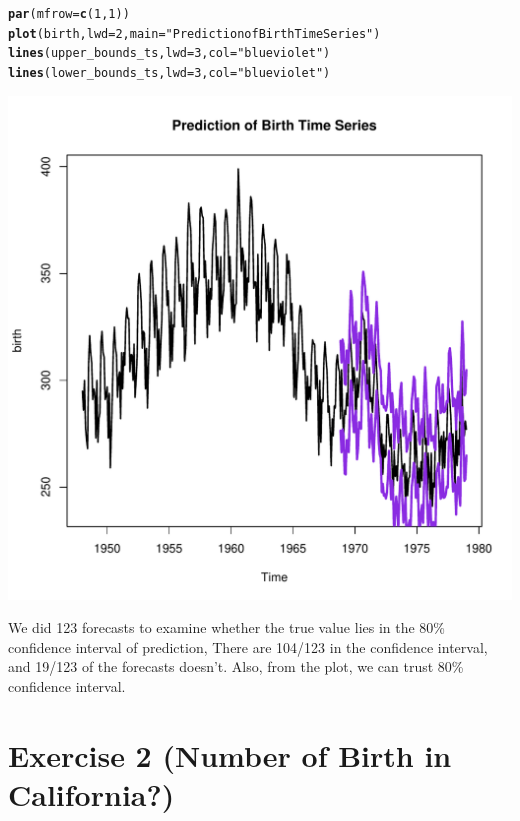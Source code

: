 \documentclass[10pt]{article}\usepackage[]{graphicx}\usepackage[]{color}
\makeatletter
\def\maxwidth{ %
  \ifdim\Gin@nat@width>\linewidth
    \linewidth
  \else
    \Gin@nat@width
  \fi
}
\newcommand{\hlnum}[1]{\textcolor[rgb]{0.686,0.059,0.569}{#1}}%
\newcommand{\hlstr}[1]{\textcolor[rgb]{0.192,0.494,0.8}{#1}}%
\newcommand{\hlstd}[1]{\textcolor[rgb]{0.345,0.345,0.345}{#1}}%
\newcommand{\hlkwc}[1]{\textcolor[rgb]{0.333,0.667,0.333}{#1}}%
\newcommand{\hlkwd}[1]{\textcolor[rgb]{0.737,0.353,0.396}{\textbf{#1}}}%
\newenvironment{kframe}{%
 \def\at@end@of@kframe{}%
 \ifinner\ifhmode%
  \def\at@end@of@kframe{\end{minipage}}%
  \begin{minipage}{\columnwidth}%
 \fi\fi%
 \def\FrameCommand##1{\hskip\@totalleftmargin \hskip-\fboxsep
 \colorbox{shadecolor}{##1}\hskip-\fboxsep
     \hskip-\linewidth \hskip-\@totalleftmargin \hskip\columnwidth}%
 \MakeFramed {\advance\hsize-\width
   \@totalleftmargin\z@ \linewidth\hsize
   \@setminipage}}%
 {\par\unskip\endMakeFramed%
 \at@end@of@kframe}
\newenvironment{knitrout}{}{} %
\makeatother
\begin{document}
\begin{knitrout}
\begin{kframe}
\begin{alltt}
\hlkwd{par}\hlstd{(}\hlkwc{mfrow}\hlstd{=}\hlkwd{c}\hlstd{(}\hlnum{1}\hlstd{,}\hlnum{1}\hlstd{))}
\hlkwd{plot}\hlstd{(birth,} \hlkwc{lwd} \hlstd{=}\hlnum{2}\hlstd{,} \hlkwc{main}\hlstd{=}\hlstr{"Prediction of Birth Time Series"}\hlstd{)}
\hlkwd{lines}\hlstd{(upper_bounds_ts,} \hlkwc{lwd} \hlstd{=} \hlnum{3}\hlstd{,} \hlkwc{col} \hlstd{=} \hlstr{"blueviolet"}\hlstd{)}
\hlkwd{lines}\hlstd{(lower_bounds_ts,} \hlkwc{lwd} \hlstd{=} \hlnum{3}\hlstd{,} \hlkwc{col} \hlstd{=} \hlstr{"blueviolet"}\hlstd{)}
\end{alltt}
\end{kframe}
\includegraphics[width=\maxwidth]{figure/unnamed-chunk-7-1} 

\end{knitrout}
We did 123 forecasts to examine whether the true value lies in the 80\% confidence interval of prediction,
There are 104/123 in the confidence interval, and 19/123 of the forecasts doesn't.
Also, from the plot, we can trust 80\% confidence interval.


\section{ Exercise 2 (Number of Birth in California?)}
\end{document}
